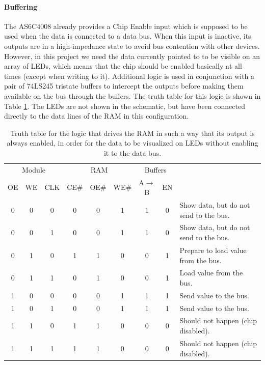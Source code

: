 \paragraph{Buffering} The AS6C4008 already provides a Chip Enable input which is supposed to be used when the data is connected to a data bus. When this input is inactive, its outputs are in a high-impedance state to avoid bus contention with other devices. However, in this project we need the data currently pointed to to be visible on an array of LEDs, which means that the chip should be enabled basically at all times (except when writing to it). Additional logic is used in conjunction with a pair of 74LS245 tristate buffers to intercept the outputs before making them available on the bus through the buffers. The truth table for this logic is shown in Table \ref{tab:ramlogic}. The LEDs are not shown in the schematic, but have been connected directly to the data lines of the RAM in this configuration.

\begin{table}[H]
  \centering
  \begin{tabular}{ccc|ccc|cc|l}
    \multicolumn{3}{c}{Module} & \multicolumn{3}{c}{RAM} & \multicolumn{2}{c}{Buffers} & \\ 
    OE & WE & CLK & CE\# & OE\# & WE\# & A$\rightarrow$B & EN &  \\ \hline
    0 & 0 & 0    & 0 & 0 & 1 & 1 & 0   & Show data, but do not send to the bus. \\
    0 & 0 & 1    & 0 & 0 & 1 & 1 & 0   & Show data, but do not send to the bus. \\
    0 & 1 & 0    & 1 & 1 & 0 & 0 & 1   & Prepare to load value from the bus. \\
    0 & 1 & 1    & 0 & 1 & 0 & 0 & 1   & Load value from the bus. \\
    1 & 0 & 0    & 0 & 0 & 1 & 1 & 1   & Send value to the bus. \\
    1 & 0 & 1    & 0 & 0 & 1 & 1 & 1   & Send value to the bus. \\
    1 & 1 & 0    & 1 & 1 & 0 & 0 & 0   & Should not happen (chip disabled). \\
    1 & 1 & 1    & 1 & 1 & 0 & 0 & 0   & Should not happen (chip disabled). \\
  \end{tabular}
  
  \caption{Truth table for the logic that drives the RAM in such a way that its output is always enabled, in order for the data to be visualized on LEDs without enabling it to the data bus.}
  \label{tab:ramlogic}
\end{table}

